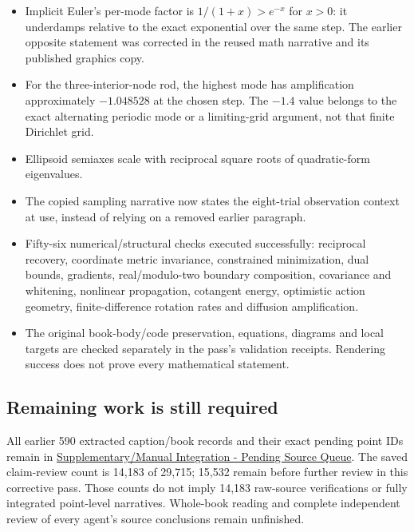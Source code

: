 \hypertarget{appendix-5056f3debc1f-supervisor-corrections-and-executed-checks}{}

\begin{itemize}
\tightlist
\item
  Implicit Euler's per-mode factor is \(1/(1+x)>e^{-x}\) for \(x>0\): it underdamps relative to the exact exponential over the same step. The earlier opposite statement was corrected in the reused math narrative and its published graphics copy.
\item
  For the three-interior-node rod, the highest mode has amplification approximately \(-1.048528\) at the chosen step. The \(-1.4\) value belongs to the exact alternating periodic mode or a limiting-grid argument, not that finite Dirichlet grid.
\item
  Ellipsoid semiaxes scale with reciprocal square roots of quadratic-form eigenvalues.
\item
  The copied sampling narrative now states the eight-trial observation context at use, instead of relying on a removed earlier paragraph.
\item
  Fifty-six numerical/structural checks executed successfully: reciprocal recovery, coordinate metric invariance, constrained minimization, dual bounds, gradients, real/modulo-two boundary composition, covariance and whitening, nonlinear propagation, cotangent energy, optimistic action geometry, finite-difference rotation rates and diffusion amplification.
\item
  The original book-body/code preservation, equations, diagrams and local targets are checked separately in the pass's validation receipts. Rendering success does not prove every mathematical statement.
\end{itemize}

\subsection{Remaining work is still required}\label{appendix-5056f3debc1f-remaining-work-is-still-required}

\hypertarget{appendix-5056f3debc1f-remaining-work-is-still-required}{}

All earlier 590 extracted caption/book records and their exact pending point IDs remain in \hyperref[appendix-ac1f51db5e9a]{Supplementary/Manual Integration - Pending Source Queue}. The saved claim-review count is 14,183 of 29,715; 15,532 remain before further review in this corrective pass. Those counts do not imply 14,183 raw-source verifications or fully integrated point-level narratives. Whole-book reading and complete independent review of every agent's source conclusions remain unfinished.

